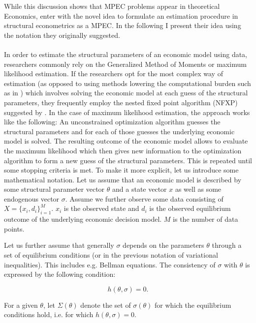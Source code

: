 While this discussion shows that MPEC problems appear in theoretical Economics, \cite{Su.Judd.2012} enter with the novel idea to formulate an estimation procedure in structural econometrics as a MPEC. In the following I present their idea using the notation they originally suggested. 

\paragraph{}
In order to estimate the structural parameters of an economic model using data, researchers commonly rely on the Generalized Method of Moments or maximum likelihood estimation. If the researchers opt for the most complex way of estimation (as opposed to using methods lowering the computational burden such as in \cite{Hotz.Miller.1993}) which involves solving the economic model at each guess of the structural parameters, they frequently employ the nested fixed point algorithm (NFXP) suggested by \cite{Rust.1987}. In the case of maximum likelihood estimation, the approach works like the following: An unconstrained optimization algorithm guesses the structural parameters and for each of those guesses the underlying economic model is solved. The resulting outcome of the economic model allows to evaluate the maximum likelihood which then gives new information to the optimization algorithm to form a new guess of the structural parameters. This is repeated until some stopping criteria is met. To make it more explicit, let us introduce some mathematical notation. Let us assume that an economic model is described by some structural parameter vector $\theta$ and a state vector $x$ as well as some endogenous vector $\sigma$. Assume we further observe some data consisting of $X = \{x_i, d_i\}^M_{i=1}$. $x_i$ is the observed state and $d_i$ is the observed equilibrium outcome of the underlying economic decision model. $M$ is the number of data points.

Let us further assume that generally $\sigma$ depends on the parameters $\theta$ through a set of equilibrium conditions (or in the previous notation of variational inequalities). This includes e.g. Bellman equations. The consistency of $\sigma$ with $\theta$ is expressed by the following condition: 

\begin{equation*}
h(\theta, \sigma) = 0.
\end{equation*}

For a given $\theta$, let $\Sigma(\theta)$ denote the set of $\sigma(\theta)$ for which the equilibrium conditions hold, i.e. for which $h(\theta,\sigma)=0$. 

